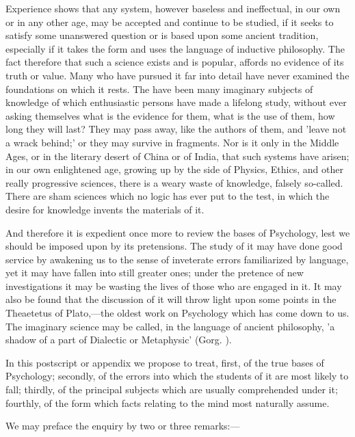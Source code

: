 \documentclass[11pt,letter]{article}
\begin{document}
\par  Experience shows that any system, however baseless and ineffectual, in our own or in any other age, may be accepted and continue to be studied, if it seeks to satisfy some unanswered question or is based upon some ancient tradition, especially if it takes the form and uses the language of inductive philosophy. The fact therefore that such a science exists and is popular, affords no evidence of its truth or value. Many who have pursued it far into detail have never examined the foundations on which it rests. The have been many imaginary subjects of knowledge of which enthusiastic persons have made a lifelong study, without ever asking themselves what is the evidence for them, what is the use of them, how long they will last? They may pass away, like the authors of them, and 'leave not a wrack behind;' or they may survive in fragments. Nor is it only in the Middle Ages, or in the literary desert of China or of India, that such systems have arisen; in our own enlightened age, growing up by the side of Physics, Ethics, and other really progressive sciences, there is a weary waste of knowledge, falsely so-called. There are sham sciences which no logic has ever put to the test, in which the desire for knowledge invents the materials of it.

\par  And therefore it is expedient once more to review the bases of Psychology, lest we should be imposed upon by its pretensions. The study of it may have done good service by awakening us to the sense of inveterate errors familiarized by language, yet it may have fallen into still greater ones; under the pretence of new investigations it may be wasting the lives of those who are engaged in it. It may also be found that the discussion of it will throw light upon some points in the Theaetetus of Plato,—the oldest work on Psychology which has come down to us. The imaginary science may be called, in the language of ancient philosophy, 'a shadow of a part of Dialectic or Metaphysic' (Gorg. ).

\par  In this postscript or appendix we propose to treat, first, of the true bases of Psychology; secondly, of the errors into which the students of it are most likely to fall; thirdly, of the principal subjects which are usually comprehended under it; fourthly, of the form which facts relating to the mind most naturally assume.

\par  We may preface the enquiry by two or three remarks:—
\end{document}
